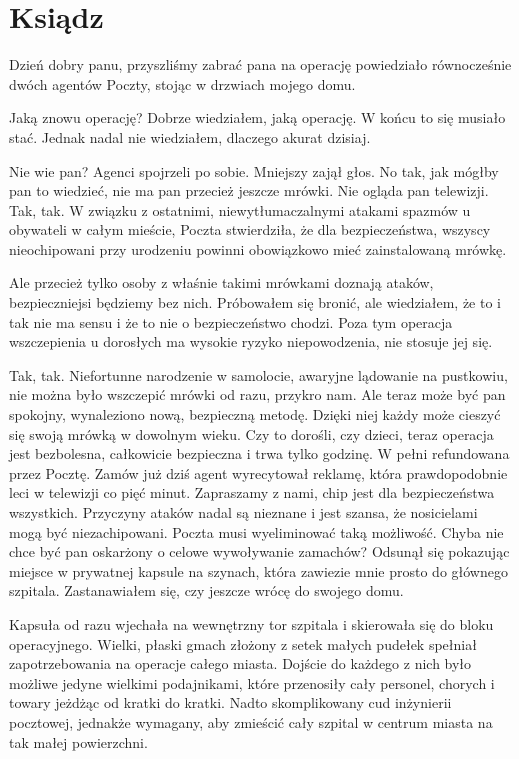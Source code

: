 \chapter{Ksiądz} 

\ds{} Dzień dobry panu, przyszliśmy zabrać pana na operację \dm{} powiedziało równocześnie dwóch agentów Poczty, stojąc w drzwiach mojego domu. \de{}

\ds{} Jaką znowu operację? \dm{} Dobrze wiedziałem, jaką operację. W końcu to się musiało stać. Jednak nadal nie wiedziałem, dlaczego akurat dzisiaj. \de{}

\ds{} Nie wie pan? \dm{} Agenci spojrzeli po sobie. Mniejszy zajął głos. \dm{} No tak, jak mógłby pan to wiedzieć, nie ma pan przecież jeszcze mrówki. Nie ogląda pan telewizji.
Tak, tak.
W związku z ostatnimi, niewytłumaczalnymi atakami spazmów u obywateli w całym mieście, Poczta stwierdziła, że dla bezpieczeństwa, 
wszyscy nieochipowani przy urodzeniu powinni obowiązkowo mieć zainstalowaną mrówkę. \de{}

\ds{} Ale przecież tylko osoby z właśnie takimi mrówkami doznają ataków, bezpieczniejsi będziemy bez nich. \dm{} Próbowałem się bronić, ale wiedziałem, że
to i tak nie ma sensu i że to nie o bezpieczeństwo chodzi. \dm{} Poza tym operacja wszczepienia u dorosłych ma wysokie ryzyko niepowodzenia, nie stosuje jej się. \de{}

\ds{} Tak, tak. Niefortunne narodzenie w samolocie, awaryjne lądowanie na pustkowiu, nie można było wszczepić mrówki od razu, przykro nam.
Ale teraz może być pan spokojny, wynaleziono nową, bezpieczną metodę. Dzięki niej każdy może cieszyć się swoją mrówką w dowolnym wieku.
Czy to dorośli, czy dzieci, teraz operacja jest bezbolesna, całkowicie bezpieczna i trwa tylko godzinę.
W pełni refundowana przez Pocztę. Zamów już dziś \dm{} agent wyrecytował reklamę, która prawdopodobnie leci w telewizji co pięć minut. \dm{}
Zapraszamy z nami, chip jest dla bezpieczeństwa wszystkich. Przyczyny ataków nadal są nieznane i jest szansa, że nosicielami mogą być niezachipowani.
Poczta musi wyeliminować taką możliwość.
Chyba nie chce być pan oskarżony o celowe wywoływanie zamachów? \dm{} Odsunął się pokazując miejsce w prywatnej kapsule na szynach, która zawiezie mnie prosto do 
głównego szpitala. Zastanawiałem się, czy jeszcze wrócę do swojego domu.

Kapsuła od razu wjechała na wewnętrzny tor szpitala i skierowała się do bloku operacyjnego. 
Wielki, płaski gmach złożony z setek małych pudełek spełniał zapotrzebowania na operacje całego miasta.
Dojście do każdego z nich było możliwe jedyne wielkimi podajnikami, które przenosiły cały personel, chorych i towary jeżdżąc od kratki do kratki.
Nadto skomplikowany cud inżynierii pocztowej, jednakże wymagany, aby zmieścić cały szpital w centrum miasta na tak małej powierzchni.

